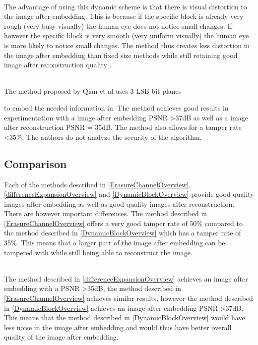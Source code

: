 \documentclass[12pt]{article}
\begin{document}
\hspace{0pt} \\
The advantage of using this dynamic scheme is that there is visual distortion to the image after embedding. 
This is because if the specific block is already very rough (very busy visually) the human eye does not notice small changes.
If however the specific block is very smooth (very uniform visually) the human eye is more likely to notice small changes.
The method thus creates less distortion in the image after embedding than fixed size methods while still retaining good image after reconstruction quality \cite{qian2011image}. 

\hspace{0pt} \\
The method proposed by Qian et al \cite{qian2011image} uses 3 LSB bit planes

to embed the needed information in.
The method achieves good results in experimentation with a image after embedding PSNR \textgreater 37dB as well as a image after reconstruction PSNR = 35dB.
The method also allows for a tamper rate \textless 35\%.
The authors do not analyze the security of the algorithm.

\subsection{Comparison}
\label{litStudyCamparison}
Each of the methods described in \ref{ErasureChannelOverview}, \ref{differenceExpansionOverview} and \ref{DynamicBlockOverview} provide good quality images after embedding as well as good quality images after reconstruction.
There are however important differences.
The method described in \ref{ErasureChannelOverview} offers a very good tamper rate of 50\% compared to the method described in \ref{DynamicBlockOverview} which has a tamper rate of 35\%.
This means that a larger part of the image after embedding can be tampered with while still being able to reconstruct the image.

\hspace{0pt} \\
The method described in \ref{differenceExpansionOverview} achieves an image after embedding with a PSNR \textgreater 35dB, the method described in \ref{ErasureChannelOverview} achieves similar results, however the method described in \ref{DynamicBlockOverview} achieves an image after embedding PSNR \textgreater 37dB.
This means that the method described in \ref{DynamicBlockOverview} would have less noise in the image after embedding and would thus have better overall quality of the image after embedding.
\end{document}
